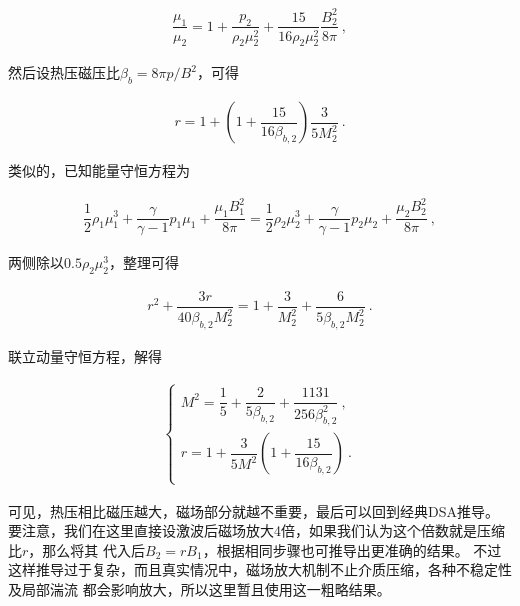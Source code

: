 \begin{equation}
    \begin{aligned}
      \dfrac{\mu_1}{\mu_2} = 1+\dfrac{p_2}{\rho_2\mu_2^2}+
      \dfrac{15}{16\rho_2\mu_2^2}\dfrac{B_2^2}{8\pi }\ ,
    \end{aligned}
\end{equation}

然后设热压磁压比$\beta_b=8\pi p/B^2$，可得

\begin{equation}
    \begin{aligned}
      r = 1+
      \left(1+\dfrac{15}{16\beta_{b,2}}\right)\dfrac{3}{5 M_2^2} \ .
    \end{aligned}
\end{equation}

类似的，已知能量守恒方程为

\begin{equation}
    \begin{aligned}
      \dfrac{1}{2}\rho_1\mu_1^3+\dfrac{\gamma}{\gamma-1}p_1\mu_1+\dfrac{\mu_1B_1^2}{8\pi}=
      \dfrac{1}{2}\rho_2\mu_2^3+\dfrac{\gamma}{\gamma-1}p_2\mu_2+\dfrac{\mu_2B_2^2}{8\pi}\ ,
    \end{aligned}
\end{equation}

两侧除以$0.5\rho_2\mu_2^3$，整理可得

\begin{equation}
    \begin{aligned}
      r^2 + \dfrac{3r}{40\beta_{b,2}M_2^2} = 1 + \dfrac{3}{M_2^2}
      +\dfrac{6}{5\beta_{b,2} M_2^2} \ .
    \end{aligned}
\end{equation}

联立动量守恒方程，解得

\begin{equation}
      \label{eqn:ratio}
    \begin{aligned}
        \begin{cases}
          M^2 = \dfrac{1}{5}+\dfrac{2}{5\beta_{b,2}}+\dfrac{1131}{256\beta_{b,2}^2} \ , \\

          r = 1 + \dfrac{3}{5M^2}\left(1+\dfrac{15}{16\beta_{b,2}}\right) \ . \\
        \end{cases}
    \end{aligned}
\end{equation}

可见，热压相比磁压越大，磁场部分就越不重要，最后可以回到经典DSA推导。
要注意，我们在这里直接设激波后磁场放大4倍，如果我们认为这个倍数就是压缩比$r$，那么将其
代入后$B_2=rB_1$，根据相同步骤也可推导出更准确的结果。
不过这样推导过于复杂，而且真实情况中，磁场放大机制不止介质压缩，各种不稳定性及局部湍流
都会影响放大，所以这里暂且使用这一粗略结果。

